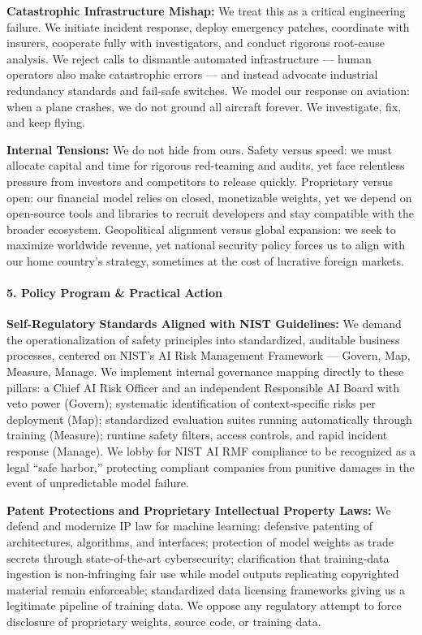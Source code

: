 \textbf{Catastrophic Infrastructure Mishap:} We treat this as a critical
engineering failure. We initiate incident response, deploy emergency
patches, coordinate with insurers, cooperate fully with investigators,
and conduct rigorous root-cause analysis. We reject calls to dismantle
automated infrastructure --- human operators also make catastrophic
errors --- and instead advocate industrial redundancy standards and
fail-safe switches. We model our response on aviation: when a plane
crashes, we do not ground all aircraft forever. We investigate, fix, and
keep flying.

\textbf{Internal Tensions:} We do not hide from ours. Safety versus
speed: we must allocate capital and time for rigorous red-teaming and
audits, yet face relentless pressure from investors and competitors to
release quickly. Proprietary versus open: our financial model relies on
closed, monetizable weights, yet we depend on open-source tools and
libraries to recruit developers and stay compatible with the broader
ecosystem. Geopolitical alignment versus global expansion: we seek to
maximize worldwide revenue, yet national security policy forces us to
align with our home country's strategy, sometimes at the cost of
lucrative foreign markets.

\paragraph{5. Policy Program \& Practical
Action}\label{policy-program-practical-action-15}

\textbf{Self-Regulatory Standards Aligned with NIST Guidelines:} We
demand the operationalization of safety principles into standardized,
auditable business processes, centered on NIST's AI Risk Management
Framework --- Govern, Map, Measure, Manage. We implement internal
governance mapping directly to these pillars: a Chief AI Risk Officer
and an independent Responsible AI Board with veto power (Govern);
systematic identification of context-specific risks per deployment
(Map); standardized evaluation suites running automatically through
training (Measure); runtime safety filters, access controls, and rapid
incident response (Manage). We lobby for NIST AI RMF compliance to be
recognized as a legal ``safe harbor,'' protecting compliant companies
from punitive damages in the event of unpredictable model failure.

\textbf{Patent Protections and Proprietary Intellectual Property Laws:}
We defend and modernize IP law for machine learning: defensive patenting
of architectures, algorithms, and interfaces; protection of model
weights as trade secrets through state-of-the-art cybersecurity;
clarification that training-data ingestion is non-infringing fair use
while model outputs replicating copyrighted material remain enforceable;
standardized data licensing frameworks giving us a legitimate pipeline
of training data. We oppose any regulatory attempt to force disclosure
of proprietary weights, source code, or training data.

